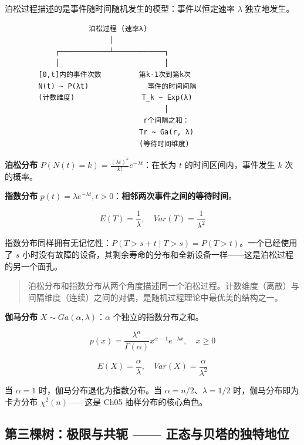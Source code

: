 \documentclass[
]{book}
\begin{document}
泊松过程描述的是事件随时间随机发生的模型：事件以恒定速率 \(\lambda\) 独立地发生。

\begin{verbatim}
                    泊松过程 (速率λ)
                         │
            ┌────────────┴────────────┐
            │                         │
        [0,t]内的事件次数         第k-1次到第k次
        N(t) ~ P(λt)              事件的时间间隔
        (计数维度)                T_k ~ Exp(λ)
                                      │
                                 r个间隔之和：
                                Tr ~ Ga(r, λ)
                                (等待时间维度)
\end{verbatim}

\textbf{泊松分布} \(P(N(t) = k) = \frac{(\lambda t)^k}{k!} e^{-\lambda t}\)：在长为 \(t\) 的时间区间内，事件发生 \(k\) 次的概率。

\textbf{指数分布} \(p(t) = \lambda e^{-\lambda t}, t > 0\)：\textbf{相邻两次事件之间的等待时间}。

\[E(T) = \frac{1}{\lambda}, \quad Var(T) = \frac{1}{\lambda^2}\]

指数分布同样拥有无记忆性：\(P(T > s+t \mid T > s) = P(T > t)\)。一个已经使用了 \(s\) 小时没有故障的设备，其剩余寿命的分布和全新设备一样------这是泊松过程的另一个面孔。

\begin{quote}
泊松分布和指数分布从两个角度描述同一个泊松过程。计数维度（离散）与间隔维度（连续）之间的对偶，是随机过程理论中最优美的结构之一。
\end{quote}

\textbf{伽马分布} \(X \sim Ga(\alpha, \lambda)\)：\(\alpha\) 个独立的指数分布之和。

\[p(x) = \frac{\lambda^\alpha}{\Gamma(\alpha)} x^{\alpha-1} e^{-\lambda x}, \quad x \geq 0\]

\[E(X) = \frac{\alpha}{\lambda}, \quad Var(X) = \frac{\alpha}{\lambda^2}\]

当 \(\alpha = 1\) 时，伽马分布退化为指数分布。当 \(\alpha = n/2\)、\(\lambda = 1/2\) 时，伽马分布即为卡方分布 \(\chi^2(n)\)------这是 Ch05 抽样分布的核心角色。

\subsection{第三棵树：极限与共轭 ------ 正态与贝塔的独特地位}\label{ux7b2cux4e09ux68f5ux6811ux6781ux9650ux4e0eux5171ux8f6d-ux6b63ux6001ux4e0eux8d1dux5854ux7684ux72ecux7279ux5730ux4f4d}
\end{document}
